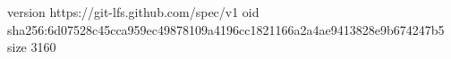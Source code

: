 version https://git-lfs.github.com/spec/v1
oid sha256:6d07528c45cca959ec49878109a4196cc1821166a2a4ae9413828e9b674247b5
size 3160

